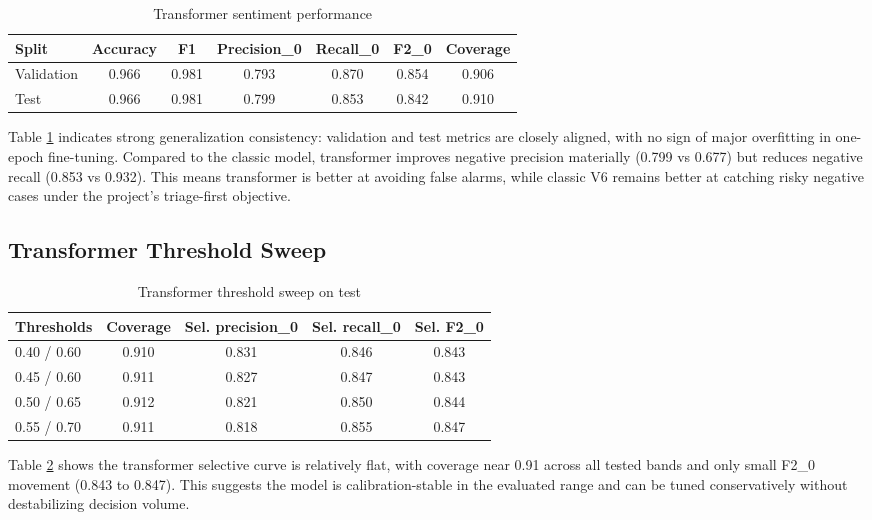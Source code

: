\documentclass[12pt,a4paper]{article}
\begin{document}
\begin{table}[H]
\centering
\caption{Transformer sentiment performance}
\label{tab:tf_metrics}
\begin{tabular}{lcccccc}
\toprule
Split & Accuracy & F1 & Precision\_0 & Recall\_0 & F2\_0 & Coverage \\
\midrule
Validation & 0.966 & 0.981 & 0.793 & 0.870 & 0.854 & 0.906 \\
Test & 0.966 & 0.981 & 0.799 & 0.853 & 0.842 & 0.910 \\
\bottomrule
\end{tabular}
\end{table}

Table \ref{tab:tf_metrics} indicates strong generalization consistency: validation and test metrics are closely aligned, with no sign of major overfitting in one-epoch fine-tuning. Compared to the classic model, transformer improves negative precision materially (0.799 vs 0.677) but reduces negative recall (0.853 vs 0.932). This means transformer is better at avoiding false alarms, while classic V6 remains better at catching risky negative cases under the project’s triage-first objective.

\subsection{Transformer Threshold Sweep}
\begin{table}[H]
\centering
\caption{Transformer threshold sweep on test}
\label{tab:tf_threshold}
\begin{tabular}{lcccc}
\toprule
Thresholds & Coverage & Sel. precision\_0 & Sel. recall\_0 & Sel. F2\_0 \\
\midrule
0.40 / 0.60 & 0.910 & 0.831 & 0.846 & 0.843 \\
0.45 / 0.60 & 0.911 & 0.827 & 0.847 & 0.843 \\
0.50 / 0.65 & 0.912 & 0.821 & 0.850 & 0.844 \\
0.55 / 0.70 & 0.911 & 0.818 & 0.855 & 0.847 \\
\bottomrule
\end{tabular}
\end{table}

Table \ref{tab:tf_threshold} shows the transformer selective curve is relatively flat, with coverage near 0.91 across all tested bands and only small F2\_0 movement (0.843 to 0.847). This suggests the model is calibration-stable in the evaluated range and can be tuned conservatively without destabilizing decision volume.
\end{document}
